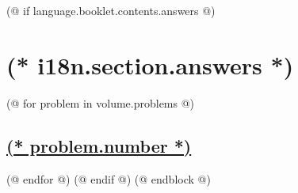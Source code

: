     (@ if language.booklet.contents.answers @)
        \section{(* i18n.section.answers *)}
        \pagestyle{answers}
        (@ for problem in volume.problems @)%
            \setcounter{problem}{(* problem.number *)}%
            \hypersetup{linkcolor=black}%
            \subsection{%
                \texorpdfstring{%
                    \hyperref[ssc:(* problem.id *)-solution]{(* problem.number *)}%
                }{%
                    (* problem.number *). (* problem.id *)%
                }%
            }%
            \label{ssc:(* problem.id*)-answer}%
            \hypersetup{linkcolor=colour-link}%
        (@ endfor @)
    (@ endif @)
(@ endblock @)
